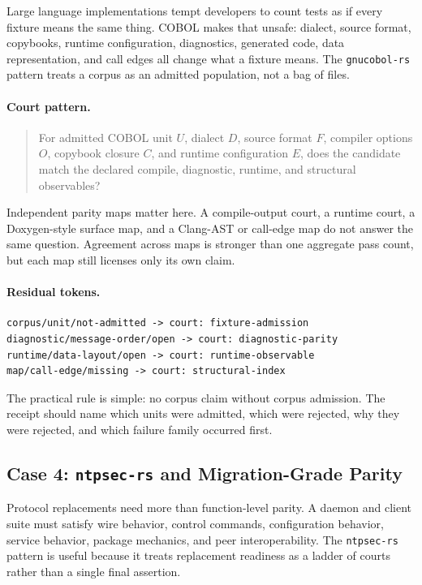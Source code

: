 \documentclass[11pt,a4paper]{article}
\begin{document}
Large language implementations tempt developers to count tests as if every fixture means the same thing. COBOL makes that unsafe: dialect, source format, copybooks, runtime configuration, diagnostics, generated code, data representation, and call edges all change what a fixture means. The \texttt{gnucobol-rs} pattern treats a corpus as an admitted population, not a bag of files.

\paragraph{Court pattern.}
\begin{quote}
For admitted COBOL unit \(U\), dialect \(D\), source format \(F\), compiler options \(O\), copybook closure \(C\), and runtime configuration \(E\), does the candidate match the declared compile, diagnostic, runtime, and structural observables?
\end{quote}
Independent parity maps matter here. A compile-output court, a runtime court, a Doxygen-style surface map, and a Clang-AST or call-edge map do not answer the same question. Agreement across maps is stronger than one aggregate pass count, but each map still licenses only its own claim.

\paragraph{Residual tokens.}
\begin{verbatim}
corpus/unit/not-admitted -> court: fixture-admission
diagnostic/message-order/open -> court: diagnostic-parity
runtime/data-layout/open -> court: runtime-observable
map/call-edge/missing -> court: structural-index
\end{verbatim}
The practical rule is simple: no corpus claim without corpus admission. The receipt should name which units were admitted, which were rejected, why they were rejected, and which failure family occurred first.

\subsection{Case 4: \texttt{ntpsec-rs} and Migration-Grade Parity}

Protocol replacements need more than function-level parity. A daemon and client suite must satisfy wire behavior, control commands, configuration behavior, service behavior, package mechanics, and peer interoperability. The \texttt{ntpsec-rs} pattern is useful because it treats replacement readiness as a ladder of courts rather than a single final assertion.
\end{document}
